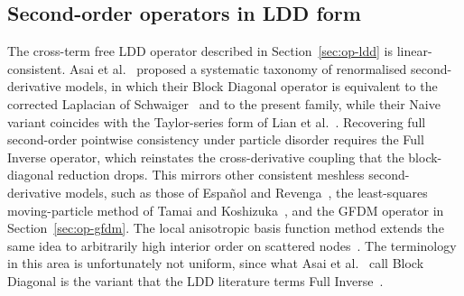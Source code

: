 \documentclass[preprint,review,12pt]{elsarticle}
\begin{document}
\subsection{Second-order operators in LDD form}
\label{sec:op-fi}

The cross-term free LDD operator described in Section~\ref{sec:op-ldd} is linear-consistent.
Asai et al.~\cite{Asai2023} proposed a systematic taxonomy of renormalised second-derivative models, in which their Block Diagonal operator is equivalent to the corrected Laplacian of Schwaiger~\cite{Schwaiger2008} and to the present family, while their Naive variant coincides with the Taylor-series form of Lian et al.~\cite{Lian2021}.
Recovering full second-order pointwise consistency under particle disorder requires the Full Inverse operator, which reinstates the cross-derivative coupling that the block-diagonal reduction drops.
This mirrors other consistent meshless second-derivative models, such as those of Espa\~nol and Revenga~\cite{Espanol2003}, the least-squares moving-particle method of Tamai and Koshizuka~\cite{Tamai2014}, and the GFDM operator in Section~\ref{sec:op-gfdm}.
The local anisotropic basis function method extends the same idea to arbitrarily high interior order on scattered nodes~\cite{King2020}.
The terminology in this area is unfortunately not uniform, since what Asai et al.~\cite{Asai2023} call Block Diagonal is the variant that the LDD literature terms Full Inverse~\cite{Basic2018,Basic2022}.
\end{document}
